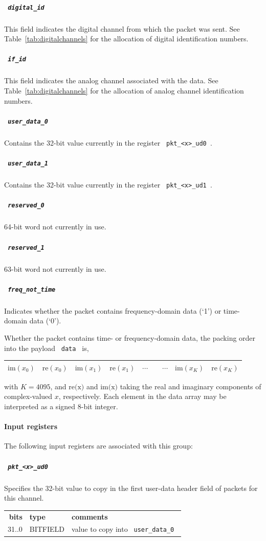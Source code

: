 \documentclass[a4paper,10pt]{article}
\newcommand{\tabref}[1]{Table~\ref{#1}}
\newcommand{\ilcode}[1]{\begingroup
	\setlength{\fboxsep}{1pt}\colorbox{ilcodebg}{\small\tt%
		#1%
	}\endgroup}
\begin{document}
\subparagraph{\ilcode{digital\_id}} This field indicates the digital 
channel from which the packet was sent. See \tabref{tab:digitalchannels}
for the allocation of digital identification numbers.

\subparagraph{\ilcode{if\_id}} This field indicates the analog channel 
associated with the data. See \tabref{tab:digitalchannels} for the 
allocation of analog channel identification numbers.

\subparagraph{\ilcode{user\_data\_0}} Contains the 32-bit value 
currently in the register \ilcode{pkt\_<x>\_ud0}.

\subparagraph{\ilcode{user\_data\_1}} Contains the 32-bit value 
currently in the register \ilcode{pkt\_<x>\_ud1}.

\subparagraph{\ilcode{reserved\_0}} 64-bit word not currently in use.

\subparagraph{\ilcode{reserved\_1}} 63-bit word not currently in use.

\subparagraph{\ilcode{freq\_not\_time}} Indicates whether the packet 
contains frequency-domain data (`1') or time-domain data (`0').

\vspace{\baselineskip}

\noindent Whether the packet contains time- or frequency-domain data, 
the packing order into the payload \ilcode{data} is,\\

\begin{tabular}{|c|c|c|c|c|c|c|}
	\hline
	$\textrm{im}(x_{0})$ & $\textrm{re}(x_{0})$ &
	$\textrm{im}(x_{1})$ & $\textrm{re}(x_{1})$ &
	$\cdots \qquad \cdots$ &
	$\textrm{im}(x_{K})$ & $\textrm{re}(x_{K})$\\
	\hline
\end{tabular}
\vspace{\baselineskip}

\noindent with $K=4095$, and $\textrm{re(x)}$ and $\textrm{im(x)}$ 
taking the real and imaginary components of complex-valued $x$, 
respectively. Each element in the data array may be interpreted as a 
signed 8-bit integer.

\paragraph{Input registers}
The following input registers are associated with this group:

\subparagraph{\ilcode{pkt\_<x>\_ud0}}
Specifies the 32-bit value to copy in the first user-data header field 
of packets for this channel.\\
\begin{tabular}{rll}
	{\bf bits} & {\bf type} & {\bf comments}\\
	  31..0 & BITFIELD & value to copy into \ilcode{user\_data\_0}
\end{tabular}
\end{document}
